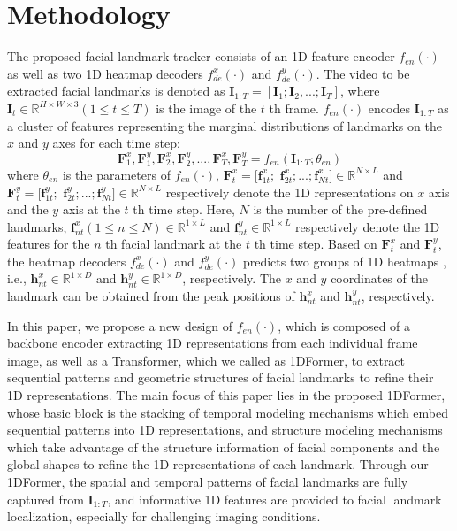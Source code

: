 \documentclass[review]{elsarticle}
\begin{document}
\section{Methodology}
The proposed facial landmark tracker consists of an 1D feature encoder $f_{en}(\cdot)$ as well as two 1D heatmap decoders $f^x_{de}(\cdot)$ and $f^y_{de}(\cdot)$. The 
video to be extracted facial landmarks is denoted as $\textbf{I}_{1:T}=[\textbf{I}_{1};\textbf{I}_{2},...;\textbf{I}_{T}]$, where $\textbf{I}_{t}\in\mathbb{R}^{ H\times W\times 3} (1\leq t \leq T)$ is the image of the $t$ th frame. $f_{en}(\cdot)$ encodes $\textbf{I}_{1:T}$ as a cluster of features representing the marginal distributions of landmarks on the $x$ and $y$ axes for each time step:
\begin{equation}
	\label{en1}
	\textbf{F}^{x}_{1},\textbf{F}^{y}_{1},\textbf{F}^{x}_{2},\textbf{F}^{y}_{2},...,\textbf{F}^{x}_{T},\textbf{F}^{y}_{T} = f_{en}(\textbf{I}_{1:T};\theta_{en})
\end{equation}
where $\theta_{en}$ is the parameters of $f_{en}(\cdot)$, $\textbf{F}^{x}_{t}=[ \textbf{f}^x_{1t};$ $\textbf{f}^x_{2t}; ...; \textbf{f}^x_{Nt}] \in\mathbb{R}^{N \times L}$ and $\textbf{F}^{y}_{t}=[ \textbf{f}^y_{1t};$ $\textbf{f}^y_{2t}; ...; \textbf{f}^y_{Nt}]\in\mathbb{R}^{N \times L}$ respectively denote the 1D representations on $x$ axis and the $y$ axis at the $t$ th time step. Here, $N$ is the number of the pre-defined landmarks, $\textbf{f}^x_{nt} (1\leq n \leq N)\in\mathbb{R}^{1 \times L}$ and $\textbf{f}^y_{nt}\in\mathbb{R}^{1 \times L}$ respectively denote the 1D features for the $n$ th facial landmark at the $t$ th time step. Based on $\textbf{F}^{x}_{t}$ and $\textbf{F}^{y}_{t}$, the heatmap decoders $f^x_{de}(\cdot)$ and  $f^y_{de}(\cdot)$ predicts two groups of 1D heatmaps \cite{AOHR,I2L}, i.e., $\textbf{h}^x_{nt}\in\mathbb{R}^{1 \times D}$ and $\textbf{h}^y_{nt}\in\mathbb{R}^{1 \times D}$, respectively.  The $x$ and $y$ coordinates of the landmark can be obtained from the peak positions of $\textbf{h}^x_{nt}$ and $\textbf{h}^y_{nt}$, respectively. 

In this paper, we propose a new design of $f_{en}(\cdot)$, which is composed of a backbone encoder extracting 1D representations from each individual frame image, as well as a Transformer, which we called as 1DFormer, to extract sequential patterns and geometric structures of facial landmarks to refine their 1D representations. The main focus of this paper lies in the proposed 1DFormer, whose basic block is the stacking of temporal modeling mechanisms which embed sequential patterns into 1D representations, and structure modeling mechanisms which take advantage of the structure information of facial components and the global shapes to refine the 1D representations of each landmark. Through our 1DFormer, the spatial and temporal patterns of facial landmarks are fully captured from $\textbf{I}_{1:T}$, and informative 1D features are provided to facial landmark localization, especially for challenging imaging conditions.
\end{document}
